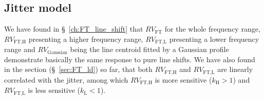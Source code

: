 \subsection{Jitter model}
\label{subsec:Jitter_model}

We have found in \S~\ref{ch:FT_line_shift} that $RV_\text{FT}$ for the whole frequency range, $RV_\text{FT,H}$ presenting a higher frequency range, $RV_\text{FT,L}$ presenting a lower frequency range and $RV_\text{Gaussian}$ being the line centroid fitted by a Gaussian profile demonstrate basically the same response to pure line shifts. We have also found in the section (\S~\ref{sec:FT_ld}) so far, that both $RV_\text{FT,H}$ and $RV_\text{FT,L}$ are linearly correlated with the jitter, among which 
$RV_\text{FT,H}$ is more sensitive ($k_\text{H}>1$) and $RV_\text{FT,L}$ is less sensitive ($k_\text{L}<1$). 

